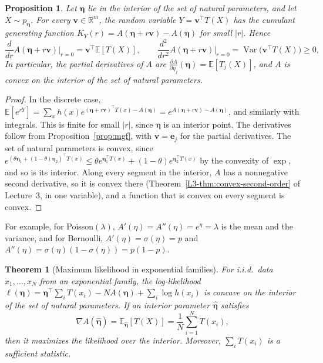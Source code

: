 \documentclass[11pt]{article}
\newcommand{\E}{\mathbb{E}}
\DeclareMathOperator{\Var}{Var}
\theoremstyle{definition}
\theoremstyle{plain}
\newtheorem{theorem}[definition]{Theorem}
\newtheorem{proposition}[definition]{Proposition}
\theoremstyle{remark}
\begin{document}
\begin{proposition}\label{prop:log-partition}
    Let $\boldsymbol{\eta}$ lie in the interior of the set of natural parameters, and let $X \sim p_{\boldsymbol{\eta}}$. For every $\mathbf{v} \in \mathbb{R}^m$, the random variable $Y = \mathbf{v}^\top T(X)$ has the cumulant generating function $K_Y(r) = A(\boldsymbol{\eta} + r\mathbf{v}) - A(\boldsymbol{\eta})$ for small $|r|$. Hence
    \[\frac{d}{dr}A(\boldsymbol{\eta} + r\mathbf{v})\Big|_{r=0} = \mathbf{v}^\top\E[T(X)], \qquad \frac{d^2}{dr^2}A(\boldsymbol{\eta} + r\mathbf{v})\Big|_{r=0} = \Var\big(\mathbf{v}^\top T(X)\big) \geq 0,\]
    In particular, the partial derivatives of $A$ are $\frac{\partial A}{\partial\eta_j}(\boldsymbol{\eta}) = \E[T_j(X)]$, and $A$ is convex on the interior of the set of natural parameters.
\end{proposition}

\begin{proof}
    In the discrete case, $\E[e^{rY}] = \sum_x h(x)e^{(\boldsymbol{\eta} + r\mathbf{v})^\top T(x) - A(\boldsymbol{\eta})} = e^{A(\boldsymbol{\eta} + r\mathbf{v}) - A(\boldsymbol{\eta})}$, and similarly with integrals. This is finite for small $|r|$, since $\boldsymbol{\eta}$ is an interior point. The derivatives follow from Proposition~\ref{prop:mgf}, with $\mathbf{v} = \mathbf{e}_j$ for the partial derivatives. The set of natural parameters is convex, since $e^{(\theta\boldsymbol{\eta}_1 + (1 - \theta)\boldsymbol{\eta}_2)^\top T(x)} \leq \theta e^{\boldsymbol{\eta}_1^\top T(x)} + (1 - \theta)e^{\boldsymbol{\eta}_2^\top T(x)}$ by the convexity of $\exp$, and so is its interior. Along every segment in the interior, $A$ has a nonnegative second derivative, so it is convex there (Theorem~\ref{L3-thm:convex-second-order} of Lecture~3, in one variable), and a function that is convex on every segment is convex.
\end{proof}

For example, for Poisson$(\lambda)$, $A'(\eta) = A''(\eta) = e^\eta = \lambda$ is the mean and the variance, and for Bernoulli, $A'(\eta) = \sigma(\eta) = p$ and $A''(\eta) = \sigma(\eta)(1 - \sigma(\eta)) = p(1 - p)$.

\begin{theorem}[Maximum likelihood in exponential families]\label{thm:exp-family-mle}
    For i.i.d.\ data $x_1, \ldots, x_N$ from an exponential family, the log-likelihood $\ell(\boldsymbol{\eta}) = \boldsymbol{\eta}^\top\sum_i T(x_i) - NA(\boldsymbol{\eta}) + \sum_i \log h(x_i)$ is concave on the interior of the set of natural parameters. If an interior parameter $\hat{\boldsymbol{\eta}}$ satisfies
    \[\nabla A(\hat{\boldsymbol{\eta}}) = \E_{\hat{\boldsymbol{\eta}}}[T(X)] = \frac{1}{N}\sum_{i=1}^N T(x_i),\]
    then it maximizes the likelihood over the interior. Moreover, $\sum_i T(x_i)$ is a sufficient statistic.
\end{theorem}
\end{document}
